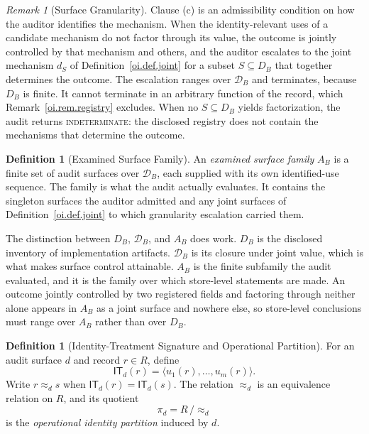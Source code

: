 \documentclass[11pt]{article}
\theoremstyle{plain}
\theoremstyle{definition}
\newtheorem{definition}[theorem]{Definition}
\theoremstyle{remark}
\newtheorem{remark}[theorem]{Remark}
\newcommand{\IT}{\ensuremath{\mathsf{IT}}}
\newcommand{\Ker}{\ensuremath{\mathrel{\approx_{d}}}}
\newcommand{\INDET}{\textnormal{\textsc{indeterminate}}}
\begin{document}
\begin{remark}[Surface Granularity]
  \label{oi.rem.granularity}
  Clause (c) is an admissibility condition on how the auditor identifies the mechanism.
  When the identity-relevant uses of a candidate mechanism
  do not factor through its value,
  the outcome is jointly controlled by that mechanism and others,
  and the auditor escalates to the joint mechanism \(d_S\)
  of Definition~\ref{oi.def.joint}
  for a subset \(S\subseteq D_B\) that together determines the outcome.
  The escalation ranges over \(\mathcal{D}_B\) and terminates,
  because \(D_B\) is finite.
  It cannot terminate in an arbitrary function of the record,
  which Remark~\ref{oi.rem.registry} excludes.
  When no \(S\subseteq D_B\) yields factorization,
  the audit returns \INDET{}:
  the disclosed registry does not contain the mechanisms
  that determine the outcome.
\end{remark}

\begin{definition}[Examined Surface Family]
  \label{oi.def.family}
  An \emph{examined surface family} \(A_B\)
  is a finite set of audit surfaces over \(\mathcal{D}_B\),
  each supplied with its own identified-use sequence.
  The family is what the audit actually evaluates.
  It contains the singleton surfaces the auditor admitted
  and any joint surfaces of Definition~\ref{oi.def.joint}
  to which granularity escalation carried them.
\end{definition}

The distinction between \(D_B\), \(\mathcal{D}_B\), and \(A_B\) does work.
\(D_B\) is the disclosed inventory of implementation artifacts.
\(\mathcal{D}_B\) is its closure under joint value,
which is what makes surface control attainable.
\(A_B\) is the finite subfamily the audit evaluated,
and it is the family over which store-level statements are made.
An outcome jointly controlled by two registered fields
and factoring through neither alone
appears in \(A_B\) as a joint surface and nowhere else,
so store-level conclusions must range over \(A_B\)
rather than over \(D_B\).

\begin{definition}[Identity-Treatment Signature and Operational Partition]
  \label{oi.def.signature}
  For an audit surface \(d\) and record \(r\in R\), define
  \[
    \IT_d(r)
    =
    \langle
    u_1(r),\ldots,u_m(r)
    \rangle.
  \]
  Write \(r\Ker s\) when \(\IT_d(r)=\IT_d(s)\).
  The relation \(\Ker\) is an equivalence relation on \(R\),
  and its quotient
  \[
    \pi_d
    =
    R\,/\Ker
  \]
  is the \emph{operational identity partition} induced by \(d\).
\end{definition}
\end{document}
